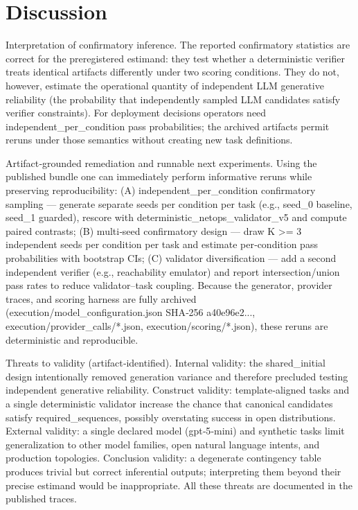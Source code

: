 \documentclass[conference]{IEEEtran}
\begin{document}
\section{Discussion}
Interpretation of confirmatory inference. The reported confirmatory statistics are correct for the preregistered estimand: they test whether a deterministic verifier treats identical artifacts differently under two scoring conditions. They do not, however, estimate the operational quantity of independent LLM generative reliability (the probability that independently sampled LLM candidates satisfy verifier constraints). For deployment decisions operators need independent\_per\_condition pass probabilities; the archived artifacts permit reruns under those semantics without creating new task definitions.

Artifact‑grounded remediation and runnable next experiments. Using the published bundle one can immediately perform informative reruns while preserving reproducibility: (A) independent\_per\_condition confirmatory sampling --- generate separate seeds per condition per task (e.g., seed\_0 baseline, seed\_1 guarded), rescore with deterministic\_netops\_validator\_v5 and compute paired contrasts; (B) multi‑seed confirmatory design --- draw K >= 3 independent seeds per condition per task and estimate per‑condition pass probabilities with bootstrap CIs; (C) validator diversification --- add a second independent verifier (e.g., reachability emulator) and report intersection/union pass rates to reduce validator--task coupling. Because the generator, provider traces, and scoring harness are fully archived (execution/model\_configuration.json SHA‑256 a40e96e2..., execution/provider\_calls/*.json, execution/scoring/*.json), these reruns are deterministic and reproducible.

Threats to validity (artifact‑identified). Internal validity: the shared\_initial design intentionally removed generation variance and therefore precluded testing independent generative reliability. Construct validity: template‑aligned tasks and a single deterministic validator increase the chance that canonical candidates satisfy required\_sequences, possibly overstating success in open distributions. External validity: a single declared model (gpt‑5‑mini) and synthetic tasks limit generalization to other model families, open natural language intents, and production topologies. Conclusion validity: a degenerate contingency table produces trivial but correct inferential outputs; interpreting them beyond their precise estimand would be inappropriate. All these threats are documented in the published traces.
\end{document}
